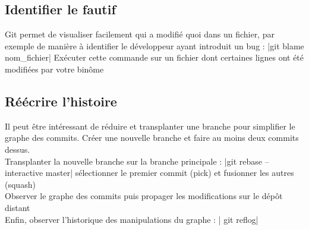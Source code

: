 \subsection{Identifier le fautif}
Git permet de visualiser facilement qui a modifié quoi dans un fichier, par exemple de manière à
identifier le développeur ayant introduit un bug : |git blame nom_fichier|
Exécuter cette commande sur un fichier dont certaines lignes ont été modifiées par votre binôme
\subsection{Réécrire l'histoire}
Il peut être intéressant de réduire et transplanter une branche pour simplifier le graphe des
commits. Créer une nouvelle branche et faire au moins deux commits dessus.\\
Transplanter la nouvelle branche sur la branche principale :
|git rebase --interactive master|
sélectionner le premier commit (pick) et fusionner les autres (squash)\\
 Observer le graphe des commits puis propager les modifications sur le dépôt distant\\
 Enfin, observer l'historique des manipulations du graphe :
| git reflog|